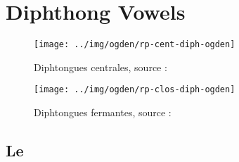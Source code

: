 \chapter{Diphthong Vowels}\label{chap:diphtong}

\begin{center}
  \begin{figure}[h]
    \centering
    \texttt{[image: ../img/ogden/rp-cent-diph-ogden]}
    \caption{Diphtongues centrales, source :~\cite{ogden} }
    \label{fig:diph-cent}
  \end{figure}
\end{center}


\begin{center}
  \begin{figure}[h]
    \centering
    \texttt{[image: ../img/ogden/rp-clos-diph-ogden]}
    \caption{Diphtongues fermantes, source :~\cite{ogden} }
    \label{fig:diph-ferm}
  \end{figure}
\end{center}


\newpage
\minitoc
\newpage

\section{Le \son {} }\label{sec:ei}

\flags
{}

